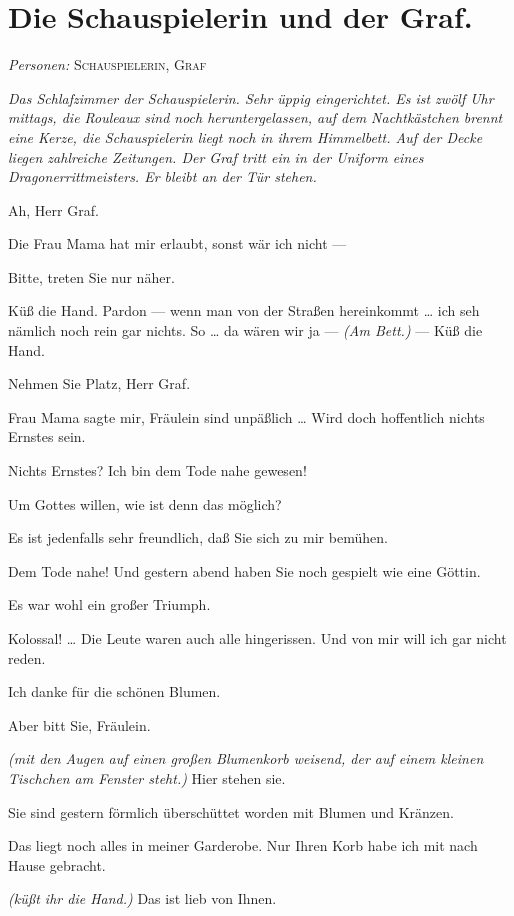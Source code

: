 \documentclass[
	final,
	a4paper,
	ngerman,
	mpinclude = true, %
	twoside = true,
	open = right,
	cleardoublepage = plain,
	DIV = 13,
	BCOR = 1cm,
	titlepage = firstiscover,
	]{scrbook}
\newcommand{\scene}{\section}
\newcommand{\direction}[1]{\textit{(#1)}}
\newcommand{\setting}[1]{\vspace{-0.5\baselineskip}\centering\textit{#1}}
\newcommand{\characterlist}[1]{{\begin{center}\textit{Personen:} #1\end{center}}}
\newcommand{\thecharacter}[1]{\textup{\textsc{#1}}}
\newcommand{\theschauspielerin}{\thecharacter{Schauspielerin}}
\newcommand{\thegraf}{\thecharacter{Graf}}
\newcommand{\character}[1]{\item[#1:]}
\newcommand{\schauspielerin}{\character{\theschauspielerin}}
\newcommand{\graf}{\character{\thegraf}}
\begin{document}
\scene{Die Schauspielerin und der Graf.}
\characterlist{\theschauspielerin, \thegraf}
\setting{Das Schlafzimmer der Schauspielerin. Sehr üppig eingerichtet. Es ist zwölf Uhr mittags, die Rouleaux sind noch heruntergelassen, auf dem Nachtkästchen brennt eine Kerze, die Schauspielerin liegt noch in ihrem Himmelbett. Auf der Decke liegen zahlreiche Zeitungen. Der Graf tritt ein in der Uniform eines Dragonerrittmeisters. Er bleibt an der Tür stehen.}
\begin{play}
	\schauspielerin
	Ah, Herr Graf.

	\graf
	Die Frau Mama hat mir erlaubt, sonst wär ich nicht ---

	\schauspielerin
	Bitte, treten Sie nur näher.

	\graf
	Küß die Hand. Pardon --- wenn man von der Straßen hereinkommt \ldots{} ich seh nämlich noch rein gar nichts. So \ldots{} da wären wir ja --- \direction{Am Bett.} --- Küß die Hand.

	\schauspielerin
	Nehmen Sie Platz, Herr Graf.

	\graf
	Frau Mama sagte mir, Fräulein sind unpäßlich \ldots{} Wird doch hoffentlich nichts Ernstes sein.

	\schauspielerin
	Nichts Ernstes? Ich bin dem Tode nahe gewesen!

	\graf
	Um Gottes willen, wie ist denn das möglich?

	\schauspielerin
	Es ist jedenfalls sehr freundlich, daß Sie sich zu mir bemühen.

	\graf
	Dem Tode nahe! Und gestern abend haben Sie noch gespielt wie eine Göttin.

	\schauspielerin
	Es war wohl ein großer Triumph.

	\graf
	Kolossal! \ldots{} Die Leute waren auch alle hingerissen. Und von mir will ich gar nicht reden.

	\schauspielerin
	Ich danke für die schönen Blumen.

	\graf
	Aber bitt Sie, Fräulein.

	\schauspielerin
	\direction{mit den Augen auf einen großen Blumenkorb weisend, der auf einem kleinen Tischchen am Fenster steht.} Hier stehen sie.

	\graf
	Sie sind gestern förmlich überschüttet worden mit Blumen und Kränzen.

	\schauspielerin
	Das liegt noch alles in meiner Garderobe. Nur Ihren Korb habe ich mit nach Hause gebracht.

	\graf
	\direction{küßt ihr die Hand.} Das ist lieb von Ihnen.


\end{play}
\end{document}
